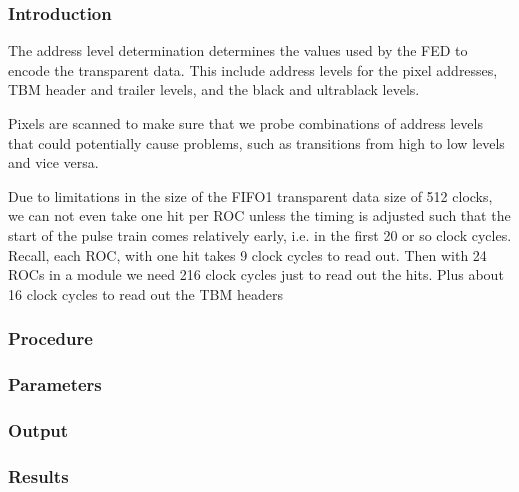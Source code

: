 \subsubsection{Introduction}
The address level determination determines the values used by the FED to encode the transparent data. This include address levels for the pixel addresses, TBM header and trailer levels, and the black and ultrablack levels.

Pixels are scanned to make sure that we probe combinations  of address levels that could potentially cause problems, such as transitions from high to low levels and vice versa.

Due to limitations in the size of the FIFO1 transparent  data size of 512 clocks, we can not even take one hit per ROC unless the timing is adjusted such that the  start of the pulse train comes relatively early, i.e. in the first 20 or so clock cycles. Recall, each ROC, with one hit takes 9 clock cycles to read out. Then with 24 ROCs in a module we need 216 clock cycles just to read out the  hits. Plus about 16 clock cycles to read out the TBM headers

\subsubsection{Procedure}
\subsubsection{Parameters}
\subsubsection{Output}
\subsubsection{Results}



